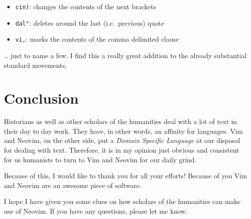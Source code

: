 \documentclass[DIV=calc, a4paper, fontsize=12pt, headings=normal, parskip=half]{scrartcl}
\begin{document}
\begin{itemize}[noitemsep]
\tightlist
\item
  \texttt{cin)}: changes the contents of the next brackets
\item
  \texttt{dal"}: deletes around the last (i.e.~previous) quote
\item
  \texttt{vi,}: marks the contents of the comma delimited clause
\end{itemize}

\ldots{} just to name a few. I find this a really great addition to the
already substantial standard movements.

\section{Conclusion}\label{conclusion}

Historians as well as other scholars of the humanities deal with a lot
of text in their day to day work. They have, in other words, an affinity
for languages. Vim and Neovim, on the other side, put a \emph{Domain
Specific Language} at our disposal for dealing with text. Therefore, it
is in my opinion just obvious and consistent for us humanists to turn to
Vim and Neovim for our daily grind.

Because of this, I would like to thank you for all your efforts! Because
of you Vim and Neovim are an awesome piece of software.

I hope I have given you some clues on how scholars of the humanities can
make use of Neovim. If you have any questions, please let me know.
\end{document}
